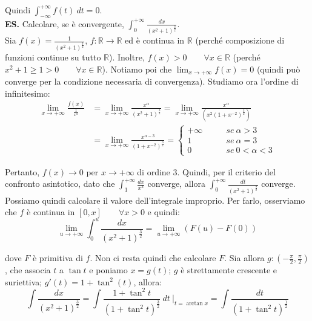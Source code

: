 \documentclass{article}
\begin{document}
\noindent Quindi $\int_{-\infty}^{+\infty} f(t) \ dt = 0$. \\

\noindent\textbf{ES.} Calcolare, se è convergente, $\int_0^{+\infty} \frac{dx}{(x^2 + 1)^\frac{3}{2}}$.\\
Sia $f(x) = \frac{1}{(x^2 + 1)^\frac{3}{2}}$, $f: \mathbb{R} \xrightarrow{} \mathbb{R}$ ed è continua in $\mathbb{R}$ (perché composizione di funzioni continue su tutto $\mathbb{R}$). Inoltre, $f(x) > 0 \qquad \forall x \in \mathbb{R}$ (perché $x^2 + 1 \geq 1 > 0 \qquad \forall x \in \mathbb{R}$). Notiamo poi che $\lim_{x \to +\infty} f(x) = 0$ (quindi può converge per la condizione necessaria di convergenza). Studiamo ora l'ordine di infinitesimo:
\begin{align*}
    \lim_{x \to +\infty} \frac{f(x)}{\frac{1}{x^\alpha}} &= \lim_{x \to +\infty} \frac{x^\alpha}{(x^2 + 1)^\frac{3}{2}} = \lim_{x \to +\infty} \frac{x^\alpha}{(x^2(1 + x^{-2})^\frac{3}{2})} \\
    &= \lim_{x \to +\infty} \frac{x^{\alpha - 3}}{(1 + x^{-2})^\frac{3}{2}} = \begin{cases}
        +\infty & \qquad se \ \alpha > 3 \\
        1 & \qquad se \ \alpha = 3 \\ 
        0 & \qquad se \ 0 < \alpha < 3
    \end{cases}
\end{align*}

\noindent Pertanto, $f(x) \to 0$ per $x \to +\infty$ di ordine $3$. Quindi, per il criterio del confronto asintotico, dato che $\int_1^{+\infty} \frac{dx}{x^3}$ converge, allora $\int_0^{+\infty} \frac{dt}{(x^2 + 1)^\frac{3}{2}}$ converge. \\
Possiamo quindi calcolare il valore dell'integrale improprio. Per farlo, osserviamo che $f$ è continua in $[0, x] \qquad \forall x > 0$ e quindi:
\begin{equation*}
    \lim_{u \to +\infty} \int_0^u \frac{dx}{(x^2 + 1)^\frac{3}{2}} = \lim_{u \to +\infty} (F(u) - F(0))
\end{equation*}

\noindent dove $F$ è primitiva di $f$. Non ci resta quindi che calcolare $F$. Sia allora $g: (-\frac{\pi}{2}, \frac{\pi}{2})$, che associa $t$ a $\tan t$ e poniamo $x = g(t)$; $g$ è strettamente crescente e suriettiva; $g'(t) = 1 + \tan^2(t)$, allora:
\begin{equation*}
    \int \frac{dx}{(x^2 + 1)^\frac{3}{2}} = \int \frac{1 + \tan^2 t}{(1 + \tan^2 t)^\frac{3}{2}} \ dt \ \bigg|_{t = \arctan x} = \int \frac{dt}{(1 + \tan^2 t)^\frac{1}{2}}
\end{equation*}
\end{document}
